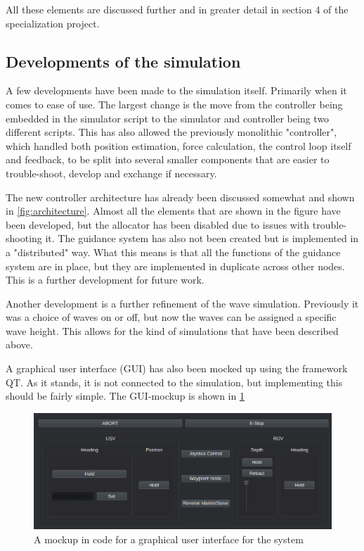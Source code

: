 \documentclass[class=article, crop=false]{standalone}
\begin{document}
All these elements are discussed further and in greater detail in section 4 of the specialization project.

\subsection{Developments of the simulation}
A few developments have been made to the simulation itself. Primarily when it comes to ease of use. The largest change is the move from the controller being embedded in the simulator script to the simulator and controller being two different scripts. This has also allowed the previously monolithic "controller", which handled both position estimation, force calculation, the control loop itself and feedback, to be split into several smaller components that are easier to trouble-shoot, develop and exchange if necessary.

The new controller architecture has already been discussed somewhat and shown in \cref{fig:architecture}. Almost all the elements that are shown in the figure have been developed, but the allocator has been disabled due to issues with trouble-shooting it. The guidance system has also not been created but is implemented in a "distributed" way. What this means is that all the functions of the guidance system are in place, but they are implemented in duplicate across other nodes. This is a further development for future work.

Another development is a further refinement of the wave simulation. Previously it was a choice of waves on or off, but now the waves can be assigned a specific wave height. This allows for the kind of simulations that have been described above.

A graphical user interface (GUI) has also been mocked up using the framework QT. As it stands, it is not connected to the simulation, but implementing this should be fairly simple. The GUI-mockup is shown in \cref{fig:gui}

\begin{figure}
    \centering
    \includegraphics{gui}
    \caption{A mockup in code for a graphical user interface for the system}
    \label{fig:gui}
\end{figure}
\end{document}
